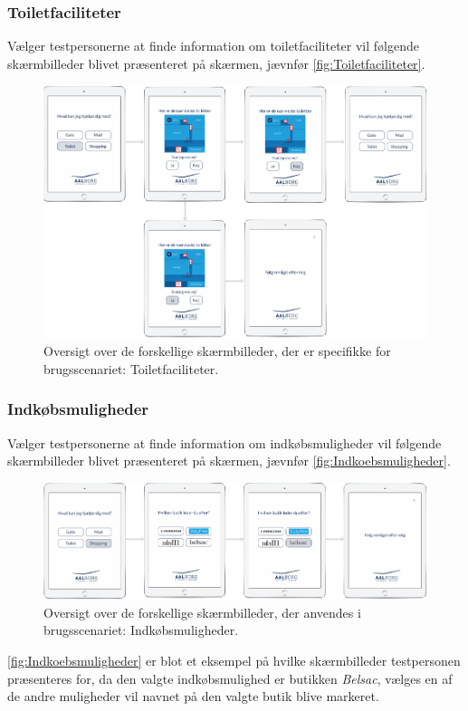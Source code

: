 \subsubsection*{Toiletfaciliteter}
%
Vælger testpersonerne at finde information om toiletfaciliteter vil følgende skærmbilleder blivet præsenteret på skærmen, jævnfør \autoref{fig:Toiletfaciliteter}. 
%
\begin{figure}[H]
\centering
\includegraphics[width = \textwidth]{Figure/TestdesignParametre/Toiletfaciliteter} 
\caption{Oversigt over de forskellige skærmbilleder, der er specifikke for brugsscenariet: Toiletfaciliteter.}
\label{fig:Toiletfaciliteter}
\end{figure}
\noindent
%  
\subsubsection*{Indkøbsmuligheder}
%
Vælger testpersonerne at finde information om indkøbsmuligheder vil følgende skærmbilleder blivet præsenteret på skærmen, jævnfør \autoref{fig:Indkoebsmuligheder}. 
%
\begin{figure}[H]
\centering
\includegraphics[width = \textwidth]{Figure/TestdesignParametre/Indkoebsmuligheder} 
\caption{Oversigt over de forskellige skærmbilleder, der anvendes i brugsscenariet: Indkøbsmuligheder.}
\label{fig:Indkoebsmuligheder}
\end{figure}
\noindent
% 
\autoref{fig:Indkoebsmuligheder} er blot et eksempel på hvilke skærmbilleder testpersonen præsenteres for, da den valgte indkøbsmulighed er butikken \textit{Belsac}, vælges en af de andre muligheder vil navnet på den valgte butik blive markeret. 

